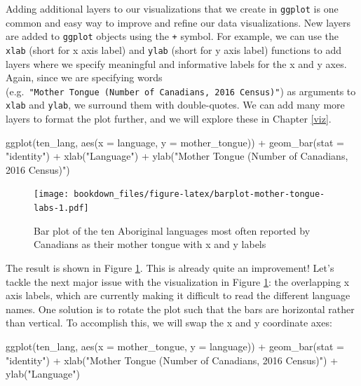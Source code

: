 \documentclass[
  12pt,
]{krantz}
\newenvironment{Shaded}{\begin{snugshade}}{\end{snugshade}}
\newcommand{\AttributeTok}[1]{\textcolor[rgb]{0.61,0.61,0.61}{#1}}
\newcommand{\FunctionTok}[1]{\textcolor[rgb]{0,0,0}{#1}}
\newcommand{\NormalTok}[1]{#1}
\newcommand{\SpecialCharTok}[1]{\textcolor[rgb]{0,0,0}{#1}}
\newcommand{\StringTok}[1]{\textcolor[rgb]{0.5,0.5,0.5}{#1}}
\begin{document}
Adding additional layers  to our visualizations that we create in \texttt{ggplot} is
one common and easy way to improve and refine our data visualizations. New
layers are added to \texttt{ggplot} objects using the \texttt{+} symbol. For example, we can
use the \texttt{xlab} (short for x axis label) and \texttt{ylab} (short for y axis label) functions
to add layers where we specify meaningful
and informative labels for the x and y axes.  Again, since we are specifying
words (e.g.~\texttt{"Mother\ Tongue\ (Number\ of\ Canadians,\ 2016\ Census)"}) as arguments to
\texttt{xlab} and \texttt{ylab}, we surround them with double-quotes. We can add many more
layers to format the plot further, and we will explore these in Chapter
\ref{viz}.

\begin{Shaded}
\begin{Highlighting}[]
\FunctionTok{ggplot}\NormalTok{(ten\_lang, }\FunctionTok{aes}\NormalTok{(}\AttributeTok{x =}\NormalTok{ language, }\AttributeTok{y =}\NormalTok{ mother\_tongue)) }\SpecialCharTok{+}
  \FunctionTok{geom\_bar}\NormalTok{(}\AttributeTok{stat =} \StringTok{"identity"}\NormalTok{) }\SpecialCharTok{+} \FunctionTok{xlab}\NormalTok{(}\StringTok{"Language"}\NormalTok{) }\SpecialCharTok{+} \FunctionTok{ylab}\NormalTok{(}\StringTok{"Mother Tongue (Number of Canadians, 2016 Census)"}\NormalTok{)}
\end{Highlighting}
\end{Shaded}

\begin{figure}
\centering
\texttt{[image: bookdown\_files/figure-latex/barplot-mother-tongue-labs-1.pdf]}
\caption{\label{fig:barplot-mother-tongue-labs}Bar plot of the ten Aboriginal languages most often reported by Canadians as their mother tongue with x and y labels}
\end{figure}

The result is shown in Figure \ref{fig:barplot-mother-tongue-labs}.
This is already quite an improvement! Let's tackle the next major issue with the visualization
in Figure \ref{fig:barplot-mother-tongue-labs}: the overlapping x axis labels, which are
currently making it difficult to read the different language names.
One solution is to rotate the plot such that the bars are horizontal rather than vertical.
To accomplish this, we will swap the x and y coordinate axes:

\begin{Shaded}
\begin{Highlighting}[]
\FunctionTok{ggplot}\NormalTok{(ten\_lang, }\FunctionTok{aes}\NormalTok{(}\AttributeTok{x =}\NormalTok{ mother\_tongue, }\AttributeTok{y =}\NormalTok{ language)) }\SpecialCharTok{+}
  \FunctionTok{geom\_bar}\NormalTok{(}\AttributeTok{stat =} \StringTok{"identity"}\NormalTok{) }\SpecialCharTok{+} \FunctionTok{xlab}\NormalTok{(}\StringTok{"Mother Tongue (Number of Canadians, 2016 Census)"}\NormalTok{) }\SpecialCharTok{+}
  \FunctionTok{ylab}\NormalTok{(}\StringTok{"Language"}\NormalTok{)}
\end{Highlighting}
\end{Shaded}
\end{document}
